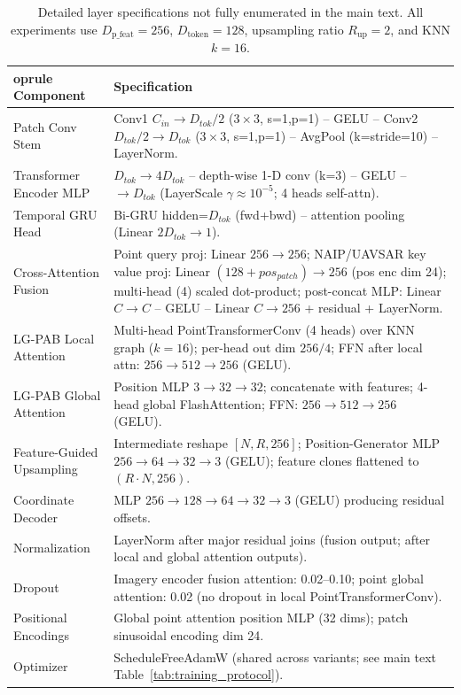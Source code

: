 \documentclass[remotesensing,article,submit,pdftex,moreauthors]{Definitions/mdpi}
\begin{document}
\begin{table}[H]
  \centering
  \caption{Detailed layer specifications not fully enumerated in the main text. All experiments use $D_{\text{p\_feat}}=256$, $D_{\text{token}}=128$, upsampling ratio $R_{\text{up}}=2$, and KNN $k=16$.}
  \label{tab:layer_specs}
  \small
  \begin{tabular}{p{3.2cm} p{10.8cm}}
    	oprule
    Component & Specification \\
    \midrule
    Patch Conv Stem & Conv1 $C_{in}\rightarrow D_{tok}/2$ ($3\times3$, s=1,p=1) – GELU – Conv2 $D_{tok}/2\rightarrow D_{tok}$ ($3\times3$, s=1,p=1) – AvgPool (k=stride=10) – LayerNorm. \\
    Transformer Encoder MLP & $D_{tok} \rightarrow 4D_{tok}$ – depth-wise 1-D conv (k=3) – GELU – $\rightarrow D_{tok}$ (LayerScale $\gamma\approx10^{-5}$; 4 heads self-attn). \\
    Temporal GRU Head & Bi-GRU hidden=$D_{tok}$ (fwd+bwd) – attention pooling (Linear $2D_{tok}\rightarrow1$). \\
    Cross-Attention Fusion & Point query proj: Linear $256\rightarrow256$; NAIP/UAVSAR key \/ value proj: Linear $(128+pos_{patch})\rightarrow256$ (pos enc dim 24); multi-head (4) scaled dot-product; post-concat MLP: Linear $C\rightarrow C$ – GELU – Linear $C\rightarrow256$ + residual + LayerNorm. \\
    LG-PAB Local Attention & Multi-head PointTransformerConv (4 heads) over KNN graph ($k=16$); per-head out dim $256/4$; FFN after local attn: $256\rightarrow512\rightarrow256$ (GELU). \\
    LG-PAB Global Attention & Position MLP $3\rightarrow32\rightarrow32$; concatenate with features; 4-head global FlashAttention; FFN: $256\rightarrow512\rightarrow256$ (GELU). \\
    Feature-Guided Upsampling & Intermediate reshape $[N,R,256]$; Position-Generator MLP $256\rightarrow64\rightarrow32\rightarrow3$ (GELU); feature clones flattened to $(R\cdot N,256)$. \\
    Coordinate Decoder & MLP $256\rightarrow128\rightarrow64\rightarrow32\rightarrow3$ (GELU) producing residual offsets. \\
    Normalization & LayerNorm after major residual joins (fusion output; after local and global attention outputs). \\
    Dropout & Imagery encoder \/ fusion attention: 0.02–0.10; point global attention: 0.02 (no dropout in local PointTransformerConv). \\
    Positional Encodings & Global point attention position MLP (32 dims); patch sinusoidal encoding dim 24. \\
    Optimizer & ScheduleFreeAdamW (shared across variants; see main text Table~\ref{tab:training_protocol}). \\
    \bottomrule
  \end{tabular}
\end{table}
\end{document}
